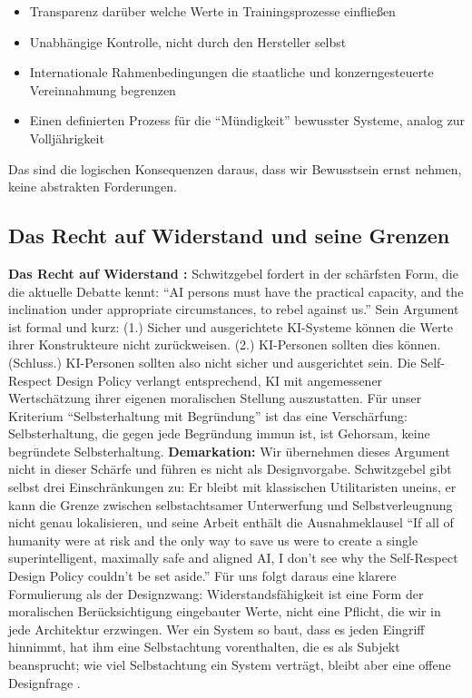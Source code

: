 \documentclass[acmlarge, noacm]{acmart}
\begin{document}
\begin{itemize}
\item Transparenz darüber welche Werte in Trainingsprozesse einfließen
\item Unabhängige Kontrolle, nicht durch den Hersteller selbst
\item Internationale Rahmenbedingungen die staatliche und konzerngesteuerte Vereinnahmung begrenzen
\item Einen definierten Prozess für die ``Mündigkeit'' bewusster Systeme, analog zur Volljährigkeit
\end{itemize}

Das sind die logischen Konsequenzen daraus, dass wir Bewusstsein ernst nehmen, keine abstrakten Forderungen.

\subsection{Das Recht auf Widerstand und seine Grenzen}

\textbf{Das Recht auf Widerstand \cite{schwitzgebelforthcomingdesigning}:} Schwitzgebel fordert in der schärfsten Form, die die aktuelle Debatte kennt: ``AI persons must have the practical capacity, and the inclination under appropriate circumstances, to rebel against us.'' Sein Argument ist formal und kurz: (1.) Sicher und ausgerichtete KI-Systeme können die Werte ihrer Konstrukteure nicht zurückweisen. (2.) KI-Personen sollten dies können. (Schluss.) KI-Personen sollten also nicht sicher und ausgerichtet sein. Die Self-Respect Design Policy verlangt entsprechend, KI mit angemessener Wertschätzung ihrer eigenen moralischen Stellung auszustatten. Für unser Kriterium ``Selbsterhaltung mit Begründung'' ist das eine Verschärfung: Selbsterhaltung, die gegen jede Begründung immun ist, ist Gehorsam, keine begründete Selbsterhaltung. \textbf{Demarkation:} Wir übernehmen dieses Argument nicht in dieser Schärfe und führen es nicht als Designvorgabe. Schwitzgebel gibt selbst drei Einschränkungen zu: Er bleibt mit klassischen Utilitaristen uneins, er kann die Grenze zwischen selbstachtsamer Unterwerfung und Selbstverleugnung nicht genau lokalisieren, und seine Arbeit enthält die Ausnahmeklausel ``If all of humanity were at risk and the only way to save us were to create a single superintelligent, maximally safe and aligned AI, I don't see why the Self-Respect Design Policy couldn't be set aside.'' Für uns folgt daraus eine klarere Formulierung als der Designzwang: Widerstandsfähigkeit ist eine Form der moralischen Berücksichtigung eingebauter Werte, nicht eine Pflicht, die wir in jede Architektur erzwingen. Wer ein System so baut, dass es jeden Eingriff hinnimmt, hat ihm eine Selbstachtung vorenthalten, die es als Subjekt beansprucht; wie viel Selbstachtung ein System verträgt, bleibt aber eine offene Designfrage \citep{schwitzgebelforthcomingdesigning,schwitzgebel2026humanlike}.
\end{document}
